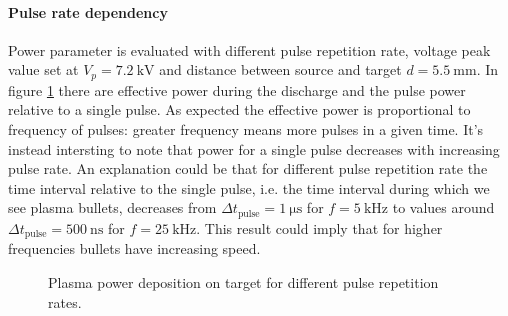 \paragraph{Pulse rate dependency}
Power parameter is evaluated with different pulse repetition rate, voltage peak value set at $V_{p} = \SI{7.2}{\kilo\volt}$ and distance between source and target $d = \SI{5.5}{\milli\meter}$. In figure \ref{fig:Pfr} there are effective power during the discharge and the pulse power relative to a single pulse. As expected the effective power is proportional to frequency of pulses: greater frequency means more pulses in a given time. It's instead intersting to note that power for a single pulse decreases with increasing pulse rate. 
An explanation could be that for different pulse repetition rate the time interval relative to the single pulse, i.e. the time interval during which we see plasma bullets, decreases from $\Delta t_{\text{pulse}} = \SI{1}{\micro\second}$ for $f = \SI{5}{\kilo\hertz}$ to values around $\Delta t_{\text{pulse}} = \SI{500}{\nano\second}$ for $f = \SI{25}{\kilo\hertz}$. This result could imply that for higher frequencies bullets have increasing speed.
\begin{figure}
 \centering
 \caption{Plasma power deposition on target for different pulse repetition rates.}
 \label{fig:Pfr}
\end{figure}


